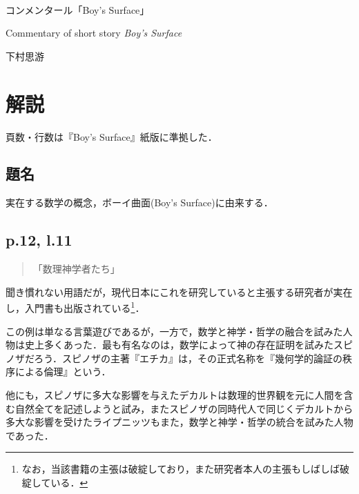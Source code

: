 \documentclass[10pt, a5paper, twoside]{jsarticle}
\theoremstyle{definition}
\begin{document}
	~ %

	\begin{center}

		\Large{コンメンタール「Boy's Surface」}

		\vspace{3mm}

		\large{Commentary of short story \textit{Boy's Surface}}

		\vspace{3mm}

		\large{下村思游}

	\end{center}

	\vspace{3mm}

	\section{解説}

        頁数・行数は『Boy's Surface』紙版\cite{boys}に準拠した．

        \subsection{題名}

            実在する数学の概念，ボーイ曲面(Boy's Surface)に由来する．

        \subsection{p.12, l.11}

            \begin{quote}

                「数理神学者たち」

            \end{quote}

            聞き慣れない用語だが，現代日本にこれを研究していると主張する研究者が実在し，入門書\cite{ochi}も出版されている\footnote{なお，当該書籍の主張は破綻しており，また研究者本人の主張もしばしば破綻している．}．

            この例は単なる言葉遊びであるが，一方で，数学と神学・哲学の融合を試みた人物は史上多くあった．最も有名なのは，数学によって神の存在証明を試みたスピノザだろう．スピノザの主著『エチカ』は，その正式名称を『幾何学的論証の秩序による倫理』という．

            他にも，スピノザに多大な影響を与えたデカルトは数理的世界観を元に人間を含む自然全てを記述しようと試み，またスピノザの同時代人で同じくデカルトから多大な影響を受けたライプニッツもまた，数学と神学・哲学の統合を試みた人物であった．
\end{document}
